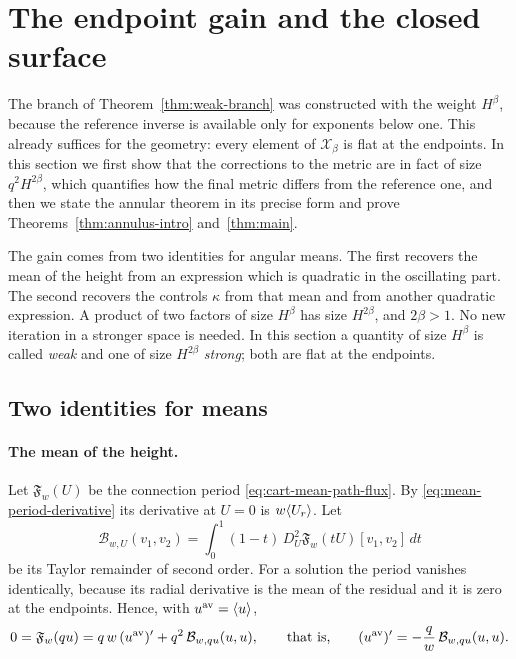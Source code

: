 \section{The endpoint gain and the closed surface}
\label{sec:final-proof}

The branch of Theorem~\ref{thm:weak-branch} was constructed with the
weight $H^\beta$, because the reference inverse is available only for
exponents below one. This already suffices for the geometry: every
element of $\mathcal X_\beta$ is flat at the endpoints. In this
section we first show that the corrections to the metric are in fact
of size $q^2H^{2\beta}$, which quantifies how the final metric
differs from the reference one, and then we state the annular theorem
in its precise form and prove Theorems~\ref{thm:annulus-intro}
and~\ref{thm:main}.

The gain comes from two identities for angular means. The first
recovers the mean of the height from an expression which is quadratic
in the oscillating part. The second recovers the controls $\kappa$
from that mean and from another quadratic expression. A product of
two factors of size $H^\beta$ has size $H^{2\beta}$, and
$2\beta>1$. No new iteration in a stronger space is needed. In this
section a quantity of size $H^\beta$ is called \emph{weak} and one of
size $H^{2\beta}$ \emph{strong}; both are flat at the endpoints.

\subsection{Two identities for means}

\paragraph{The mean of the height.}
Let $\mathfrak F_w(U)$ be the connection period
\eqref{eq:cart-mean-path-flux}. By
\eqref{eq:mean-period-derivative} its derivative at $U=0$ is
$w\langle U_r\rangle$. Let
\begin{equation}\label{eq:posterior-period-bilinear}
 \mathcal B_{w,U}(v_1,v_2)
 =\int_0^1(1-t)\,D_U^2\mathfrak F_w(tU)[v_1,v_2]\,dt
\end{equation}
be its Taylor remainder of second order. For a solution the period
vanishes identically, because its radial derivative is the mean of the
residual and it is zero at the endpoints. Hence, with
$u^{\rm av}=\langle u\rangle$,
\begin{equation}\label{eq:mean-recovered-derivative}
 0=\mathfrak F_w(qu)=q\,w\,(u^{\rm av})'
   +q^2\,\mathcal B_{w,qu}(u,u),
 \qquad\text{that is,}\qquad
 (u^{\rm av})'=-\frac qw\,\mathcal B_{w,qu}(u,u) .
\end{equation}

